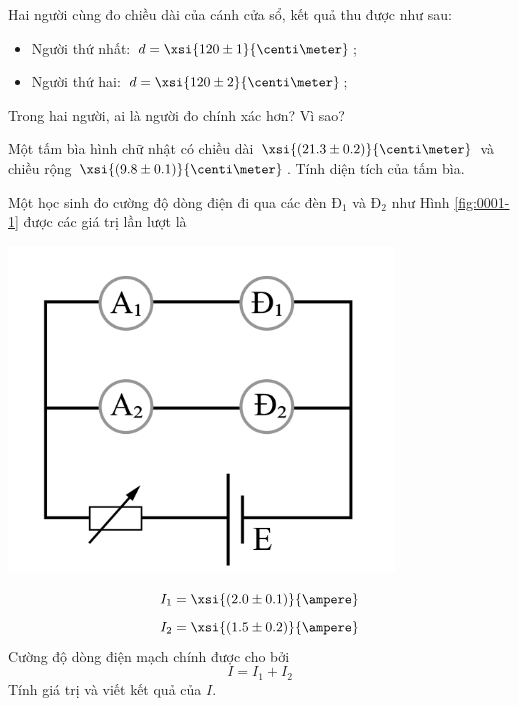 \begin{ex}
	Hai người cùng đo chiều dài của cánh cửa sổ, kết quả thu được như sau:
	\begin{itemize}
		\item Người thứ nhất: $d=\xsi{120\pm1}{\centi\meter}$;
		\item Người thứ hai: $d=\xsi{120\pm 2}{\centi\meter}$;
	\end{itemize}
	Trong hai người, ai là người đo chính xác hơn? Vì sao?
\end{ex}

\begin{ex}
	Một tấm bìa hình chữ nhật có chiều dài $\xsi{\left(21.3\pm0.2\right)}{\centi\meter}$ và chiều rộng $\xsi{\left(9.8\pm0.1\right)}{\centi\meter}$. Tính diện tích của tấm bìa.
\end{ex}

\begin{ex}
	Một học sinh đo cường độ dòng điện đi qua các đèn $\text{Đ}_1$ và $\text{Đ}_2$ như Hình \ref{fig:0001-1} được các giá trị lần lượt là 
	\begin{center}
		\includegraphics[width=0.3\linewidth]{figs/FINAL-CHAPTER1-1}
		\label{fig:0001-1}
	\end{center}
	$$I_1=\xsi{\left(2.0\pm0.1\right)}{\ampere}$$
	$$I_2=\xsi{\left(1.5\pm0.2\right)}{\ampere}$$
	Cường độ dòng điện mạch chính được cho bởi
	$$I=I_1+I_2$$
	Tính giá trị và viết kết quả của $I$.
\end{ex}

